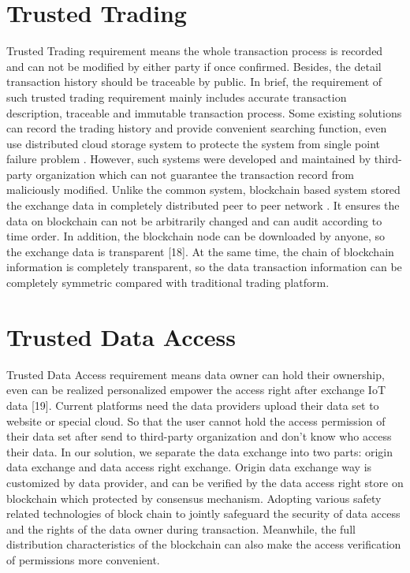\section{Trusted Trading}
Trusted Trading requirement means the whole
transaction process is recorded and can not be modified by
either party if once confirmed. Besides, the detail transaction
history should be traceable by public.
In brief, the requirement of such trusted trading
requirement mainly includes accurate transaction description,
traceable and immutable transaction process. Some existing
solutions can record the trading history and provide
convenient searching function, even use distributed cloud
storage system to protecte the system from single point
failure problem . However, such systems were developed
and maintained by third-party organization which can not
guarantee the transaction record from maliciously modified.
Unlike the common system, blockchain based system
stored the exchange data in completely distributed peer to
peer network . It ensures the data on blockchain can not
be arbitrarily changed and can audit according to time order.
In addition, the blockchain node can be downloaded by
anyone, so the exchange data is transparent [18]. At the same
time, the chain of blockchain information is completely
transparent, so the data transaction information can be
completely symmetric compared with traditional trading
platform.
\section{Trusted Data Access}
Trusted Data Access requirement means data owner can
hold their ownership, even can be realized personalized
empower the access right after exchange IoT data [19].
Current platforms need the data providers upload their
data set to website or special cloud. So that the user cannot
hold the access permission of their data set after send to
third-party organization and don’t know who access their
data. In our solution, we separate the data exchange into two
parts: origin data exchange and data access right exchange.
Origin data exchange way is customized by data provider,
and can be verified by the data access right store on
blockchain which protected by consensus mechanism.
Adopting various safety related technologies of block chain
to jointly safeguard the security of data access and the rights
of the data owner during transaction. Meanwhile, the full
distribution characteristics of the blockchain can also make
the access verification of permissions more convenient.
